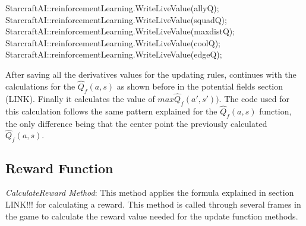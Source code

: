 \begin{Sourcecode}[caption=Saving the values of each derivative]
		StarcraftAI::reinforcementLearning.WriteLiveValue(allyQ);
		StarcraftAI::reinforcementLearning.WriteLiveValue(squadQ); 
		StarcraftAI::reinforcementLearning.WriteLiveValue(maxdistQ);
		StarcraftAI::reinforcementLearning.WriteLiveValue(coolQ);
		StarcraftAI::reinforcementLearning.WriteLiveValue(edgeQ);
\end{Sourcecode}

After saving all the derivatives values for the updating rules, continues with the calculations for the $\hat{Q}_f(a,s)$ as shown before in the potential fields section (LINK). Finally it calculates the value of $max\hat{Q}_f(a',s'))$. The code used for this calculation follows the same pattern explained for the $\hat{Q}_f(a,s)$ function, the only difference being that the center point the previously calculated $\hat{Q}_f(a,s)$.

\subsection{Reward Function}
 
\textit{CalculateReward Method}: This method applies the formula explained in section LINK!!! for calculating a reward. This method is called through several frames in the game to calculate the reward value needed for the update function methods.\\

